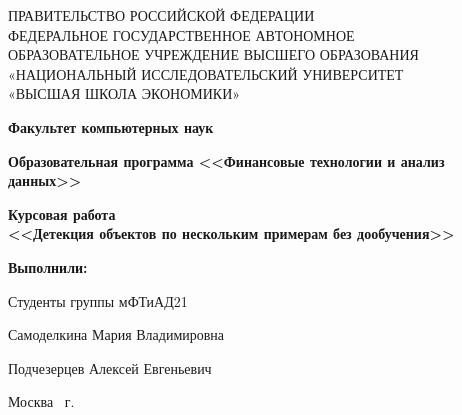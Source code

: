 \begin{titlepage}
    \begin{center}
        ПРАВИТЕЛЬСТВО РОССИЙСКОЙ ФЕДЕРАЦИИ \\
        ФЕДЕРАЛЬНОЕ ГОСУДАРСТВЕННОЕ АВТОНОМНОЕ \\
        ОБРАЗОВАТЕЛЬНОЕ УЧРЕЖДЕНИЕ ВЫСШЕГО ОБРАЗОВАНИЯ\\
        «НАЦИОНАЛЬНЫЙ ИССЛЕДОВАТЕЛЬСКИЙ УНИВЕРСИТЕТ\\
        «ВЫСШАЯ ШКОЛА ЭКОНОМИКИ»
    \end{center}

    \begin{center}
        \textbf{Факультет компьютерных наук}

        \textbf{Образовательная программа <<Финансовые технологии и анализ данных>>}


    \end{center}
    \vspace{1ex}

    \begin{center}
        \textbf{Курсовая работа \\
            <<Детекция объектов по нескольким примерам без дообучения>>
        }
    \end{center}

    \vspace{2ex}
    \vfill

    \vspace{2ex}

    \begin{flushright}
        \textbf{Выполнили:}

        \vspace{2ex}

        Студенты группы мФТиАД21

        \vspace{2ex}

        Самоделкина Мария Владимировна

        Подчезерцев Алексей Евгеньевич



    \end{flushright}

    \vspace{5ex}
    \begin{center}
        Москва \the\year \, г.
    \end{center}

\end{titlepage}
\addtocounter{page}{1}